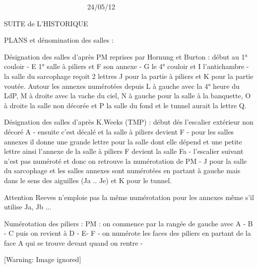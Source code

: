 \documentclass{article}
\title{}
\begin{document}
\ \ \ \ \ \ \ \ \ \ \ \ \ \ \ \ \ \ \ \ \ \ \ \   24/05/12

SUITE de L’HISTORIQUE

PLANS et dénomination des salles : 

Désignation des salles d’après PM reprises par Hornung et Burton : début
au 1° couloir {}- E 1° salle à piliers et F son annexe {}- G le 4°
couloir et I l’antichambre {}- la salle du sarcophage reçoit 2 lettres
J pour la partie à piliers et K pour la partie voutée. Autour les
annexes numérotées depuis L à gauche avec la 4° heure du LdP, M à
droite avec la vache du ciel, N à gauche pour la salle à la banquette,
O à droite la salle non décorée et P la salle du fond et le tunnel
aurait la lettre Q.

Désignation des salles d’après K.Weeks (TMP) : début dés l’escalier
extérieur non décoré  A {}-  ensuite c’est décalé et la salle à piliers
devient F {}- pour les salles annexes il donne une grande lettre pour
la salle dont elle dépend et une petite lettre ainsi l’annexe de la
salle à piliers F devient la salle Fa {}- l’escalier suivant n’est pas
numéroté et donc on retrouve la numérotation de PM {}- J pour la salle
du sarcophage et les salles annexes sont numérotées en partant à gauche
mais dans le sens des aiguilles (Ja .. Je) et K pour le tunnel.

Attention Reeves n’emploie pas la même numérotation pour les annexes
même s’il utilise Ja, Jb ...



\begin{figure}[htp]

\end{figure}
Numérotation des piliers : PM : on commence par la rangée de gauche avec
A {}- B {}- C puis on revient à D {}- E- F {}- on numérote les faces
des piliers en partant de la face A qui se trouve devant quand on
rentre {}-



\begin{figure}[htp]

\end{figure}
  [Warning: Image ignored] %
 
\end{document}
